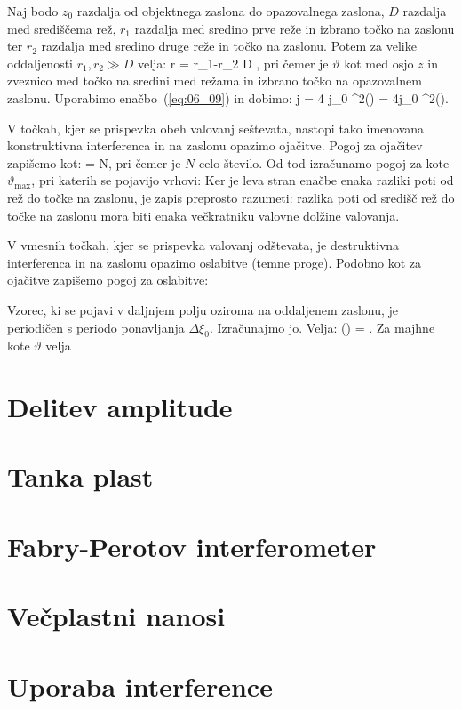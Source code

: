 Naj bodo $z_0$ razdalja od objektnega zaslona do opazovalnega zaslona, $D$ razdalja 
med središčema rež, $r_1$ razdalja med sredino prve reže in izbrano točko na zaslonu
ter $r_2$ razdalja med sredino druge reže in točko na zaslonu. Potem za velike 
oddaljenosti $r_1, r_2 \gg D$ velja:
\beq
\Delta r = r_1-r_2 \approx D \sin\vartheta,
\label{eq:06_16}
\eeq
pri čemer je $\vartheta$ kot med osjo $z$ in zveznico med točko na sredini med režama in
izbrano točko na opazovalnem zaslonu. Uporabimo enačbo~(\ref{eq:06_09}) in dobimo:
\beq
j = 4 j_0 \cos^2\left(\right) = 4j_0 \cos^2\left(\right).
\label{eq:06_17}
\eeq

V točkah, kjer se prispevka obeh valovanj seštevata, nastopi tako imenovana
konstruktivna interferenca in na zaslonu opazimo ojačitve. Pogoj za ojačitev zapišemo kot:
\beq
{} = N\pi,
\label{eq:06_18}
\eeq
pri čemer je $N$ celo število. Od tod izračunamo pogoj za kote $\vartheta_\mathrm{max}$, pri katerih
se pojavijo vrhovi:
Ker je leva stran enačbe enaka razliki poti od rež do točke na zaslonu, je zapis preprosto razumeti:
razlika poti od središč rež do točke na zaslonu mora biti enaka večkratniku valovne dolžine valovanja.

V vmesnih točkah, kjer se prispevka valovanj odštevata, je destruktivna
interferenca in na zaslonu opazimo oslabitve (temne proge). Podobno kot za ojačitve
zapišemo pogoj za oslabitve:

Vzorec, ki se pojavi v daljnjem polju oziroma na oddaljenem zaslonu,
je periodičen s periodo ponavljanja $\Delta \xi_0$. Izračunajmo jo. Velja:
\beq
\Delta \left(\right) = \pi.
\label{eq:06_19}
\eeq
Za majhne kote $\vartheta$ velja 
















\section{Delitev amplitude}
\section{Tanka plast}
\section{Fabry-Perotov interferometer}
\section{Večplastni nanosi}
\section{Uporaba interference}
